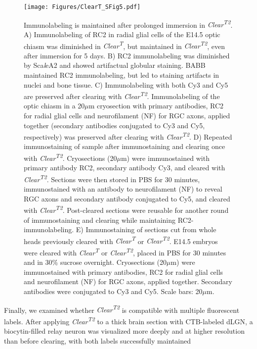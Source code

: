 \begin{figure}[hbtp]
    \begin{center}
        \texttt{[image: Figures/ClearT\_SFig5.pdf]}
        \caption[Immunolabeling is maintained after prolonged immersion in \emph{Clear\textsuperscript{T2}}.]
        {Immunolabeling is maintained after prolonged immersion in \emph{Clear\textsuperscript{T2}}.
        A) Immunolabeling of RC2 in radial glial cells of the E14.5 optic chiasm was diminished in \emph{Clear\textsuperscript{T}}, but maintained in \emph{Clear\textsuperscript{T2}}, even after immersion for 5 days.
        B) RC2 immunolabeling was diminished by Sca\emph{l}eA2 and showed artifactual globular staining.
        BABB maintained RC2 immunolabeling, but led to staining artifacts in nuclei and bone tissue.
        C) Immunolabeling with both Cy3 and Cy5 are preserved after clearing with \emph{Clear\textsuperscript{T2}}.
        Immunolabeling of the optic chiasm in a 20$\mu$m cryosection with primary antibodies, RC2 for radial glial cells
and neurofilament (NF) for RGC axons, applied together (secondary antibodies conjugated to Cy3 and Cy5, respectively) was
preserved after clearing with \emph{Clear\textsuperscript{T2}}.
        D) Repeated immunostaining of sample after immunostaining and clearing once with \emph{Clear\textsuperscript{T2}}.
        Cryosections (20$\mu$m) were immunostained with primary antibody RC2, secondary antibody Cy3, and cleared with \emph{Clear\textsuperscript{T2}}.
        Sections were then stored in PBS for 30 minutes, immunostained with an antibody to neurofilament (NF) to reveal RGC axons and secondary antibody conjugated to Cy5, and cleared with \emph{Clear\textsuperscript{T2}}.
        Post-cleared sections were reusable for another round of immunostaining and clearing while maintaining RC2-immunolabeling.
        E) Immunostaining of sections cut from whole heads previously cleared with \emph{Clear\textsuperscript{T}} or \emph{Clear\textsuperscript{T2}}.
        E14.5 embryos were cleared with \emph{Clear\textsuperscript{T}} or \emph{Clear\textsuperscript{T2}}, placed in PBS for 30 minutes and in 30\% sucrose overnight.
        Cryosections (20$\mu$m) were immunostained with primary antibodies, RC2 for radial glial cells and neurofilament (NF) for RGC axons, applied together.
        Secondary antibodies were conjugated to Cy3 and Cy5.
        Scale bars: 20$\mu$m.
        }
        \label{ClearT\_SFig5}
    \end{center}
\end{figure}

Finally, we examined whether \emph{Clear\textsuperscript{T2}} is compatible with multiple fluorescent labels.
After applying \emph{Clear\textsuperscript{T2}} to a thick brain section with CTB-labeled dLGN, a biocytin-filled relay neuron was visualized more deeply and at higher resolution than before clearing, with both labels successfully maintained %
